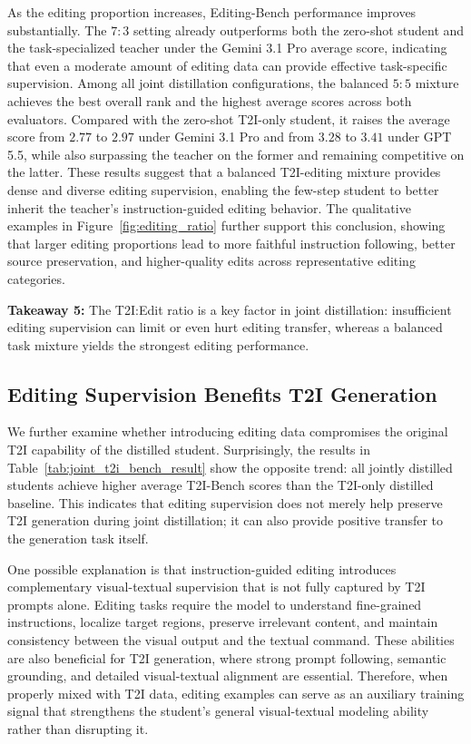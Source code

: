 \documentclass{article}
\begin{document}
As the editing proportion increases, Editing-Bench performance improves substantially. The $7{:}3$ setting already outperforms both the zero-shot student and the task-specialized teacher under the Gemini 3.1 Pro average score, indicating that even a moderate amount of editing data can provide effective task-specific supervision. Among all joint distillation configurations, the balanced $5{:}5$ mixture achieves the best overall rank and the highest average scores across both evaluators. Compared with the zero-shot T2I-only student, it raises the average score from $2.77$ to $2.97$ under Gemini 3.1 Pro and from $3.28$ to $3.41$ under GPT 5.5, while also surpassing the teacher on the former and remaining competitive on the latter. These results suggest that a balanced T2I-editing mixture provides dense and diverse editing supervision, enabling the few-step student to better inherit the teacher's instruction-guided editing behavior. The qualitative examples in Figure~\ref{fig:editing_ratio} further support this conclusion, showing that larger editing proportions lead to more faithful instruction following, better source preservation, and higher-quality edits across representative editing categories.


\begin{tcolorbox}[
colback=blue!3,
colframe=blue!70!black,
boxrule=0.8pt,
arc=6pt,
left=6pt,
right=6pt,
top=4pt,
bottom=4pt
]
\textbf{Takeaway 5:} The T2I:Edit ratio is a key factor in joint distillation: insufficient editing supervision can limit or even hurt editing transfer, whereas a balanced task mixture yields the strongest editing performance.
\end{tcolorbox}



\subsection{Editing Supervision Benefits T2I Generation}

We further examine whether introducing editing data compromises the original T2I capability of the distilled student. Surprisingly, the results in Table~\ref{tab:joint_t2i_bench_result} show the opposite trend: all jointly distilled students achieve higher average T2I-Bench scores than the T2I-only distilled baseline. This indicates that editing supervision does not merely help preserve T2I generation during joint distillation; it can also provide positive transfer to the generation task itself.

One possible explanation is that instruction-guided editing introduces complementary visual-textual supervision that is not fully captured by T2I prompts alone. Editing tasks require the model to understand fine-grained instructions, localize target regions, preserve irrelevant content, and maintain consistency between the visual output and the textual command. These abilities are also beneficial for T2I generation, where strong prompt following, semantic grounding, and detailed visual-textual alignment are essential. Therefore, when properly mixed with T2I data, editing examples can serve as an auxiliary training signal that strengthens the student's general visual-textual modeling ability rather than disrupting it.
\end{document}
